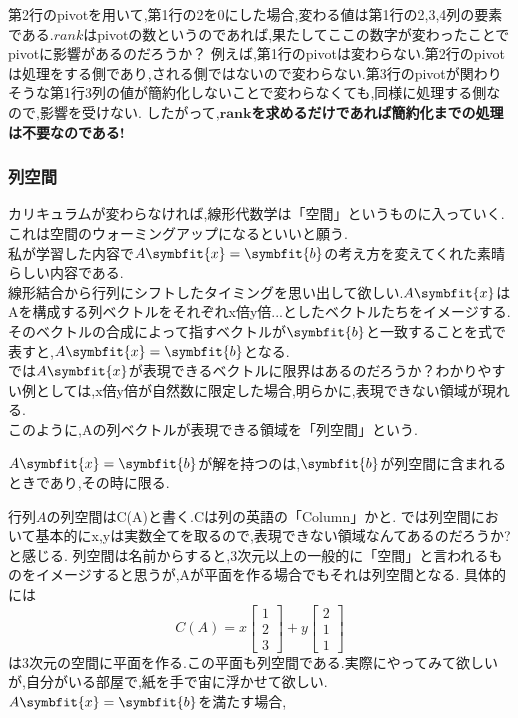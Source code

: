 第2行のpivotを用いて,第1行の2を0にした場合,変わる値は第1行の2,3,4列の要素である.$rank$はpivotの数というのであれば,果たしてここの数字が変わったことでpivotに影響があるのだろうか？
例えば,第1行のpivotは変わらない.第2行のpivotは処理をする側であり,される側ではないので変わらない.第3行のpivotが関わりそうな第1行3列の値が簡約化しないことで変わらなくても,同様に処理する側なので,影響を受けない.
したがって,\textbf{$\textbf{rank}$を求めるだけであれば簡約化までの処理は不要なのである!}
\subsubsection{列空間}\label{subsub:colspace}
カリキュラムが変わらなければ,線形代数学は「空間」というものに入っていく.これは空間のウォーミングアップになるといいと願う.\\
私が学習した内容で$A\symbfit{x}=\symbfit{b}$の考え方を変えてくれた素晴らしい内容である.\\
線形結合から行列にシフトしたタイミングを思い出して欲しい.$A\symbfit{x}$はAを構成する列ベクトルをそれぞれx倍y倍...としたベクトルたちをイメージする.
そのベクトルの合成によって指すベクトルが$\symbfit{b}$と一致することを式で表すと,$A\symbfit{x}=\symbfit{b}$となる.\\
では$A\symbfit{x}$が表現できるベクトルに限界はあるのだろうか？わかりやすい例としては,x倍y倍が自然数に限定した場合,明らかに,表現できない領域が現れる.\\
このように,Aの列ベクトルが表現できる領域を「列空間」という.\\
\begin{tcolorbox}[colframe=black!80,colback=white,title={$A\symbfit{x}=\symbfit{b}$における解の存在条件}]
$A\symbfit{x}=\symbfit{b}$が解を持つのは,$\symbfit{b}$が列空間に含まれるときであり,その時に限る.
\end{tcolorbox}
行列$A$の列空間はC(A)と書く.Cは列の英語の「Column」かと.
では列空間において基本的にx,yは実数全てを取るので,表現できない領域なんてあるのだろうか?と感じる.
列空間は名前からすると,3次元以上の一般的に「空間」と言われるものをイメージすると思うが,Aが平面を作る場合でもそれは列空間となる.
\newpage
具体的には
\[
C(A)=
x
\begin{bmatrix}1 \\2 \\3\end{bmatrix}
+y
\begin{bmatrix}2 \\ 1 \\ 1\end{bmatrix}
\]
は3次元の空間に平面を作る.この平面も列空間である.実際にやってみて欲しいが,自分がいる部屋で,紙を手で宙に浮かせて欲しい.$A\symbfit{x}=\symbfit{b}$を満たす場合,
